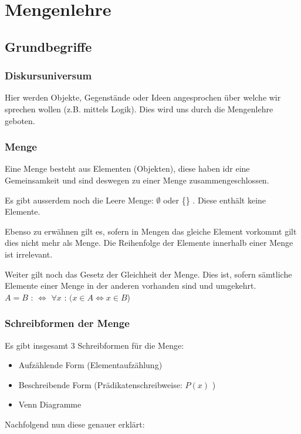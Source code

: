 \documentclass[a4paper,12pt]{article}
\begin{document}
\newpage
\section{Mengenlehre}

\subsection{Grundbegriffe}

\subsubsection{Diskursuniversum}
Hier werden Objekte, Gegenstände oder Ideen angesprochen über welche wir sprechen wollen (z.B. mittels Logik). Dies wird uns durch die Mengenlehre geboten.

\subsubsection{Menge}
Eine Menge besteht aus Elementen (Objekten), diese haben idr eine Gemeinsamkeit und sind deswegen zu einer Menge zusammengeschlossen.

Es gibt ausserdem noch die Leere Menge:  $\emptyset$ oder \{\} . Diese enthält keine Elemente.

Ebenso zu erwähnen gilt es, sofern in Mengen das gleiche Element vorkommt gilt dies nicht mehr als Menge. Die Reihenfolge der Elemente innerhalb einer Menge ist irrelevant.

Weiter gilt noch das Gesetz der Gleichheit der Menge. Dies ist, sofern sämtliche Elemente einer Menge in der anderen vorhanden sind und umgekehrt. \\
$A = B$ :  $\Leftrightarrow$  $\forall x$ : \((x \in  A \Leftrightarrow x \in  B\))

\subsubsection{Schreibformen der Menge}
Es gibt insgesamt 3 Schreibformen für die Menge:
\begin{itemize}
  \item Aufzählende Form (Elementaufzählung)
  \item Beschreibende Form (Prädikatenschreibweise: \( P(x) \) )
  \item Venn Diagramme
\end{itemize}

Nachfolgend nun diese genauer erklärt:
\end{document}
